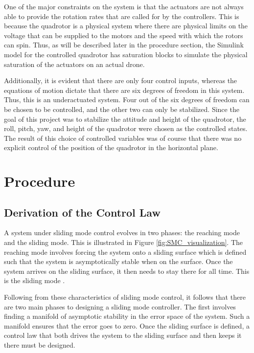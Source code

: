 \documentclass[12pt]{article}
\begin{document}
One of the major constraints on the system is that the actuators are not always able to provide the rotation rates that are called for by the controllers. This is because the quadrotor is a physical system where there are physical limits on the voltage that can be supplied to the motors and the speed with which the rotors can spin. Thus, as will be described later in the procedure section, the Simulink model for the controlled quadrotor has saturation blocks to simulate the physical saturation of the actuators on an actual drone.

Additionally, it is evident that there are only four control inputs, whereas the equations of motion dictate that there are six degrees of freedom in this system. Thus, this is an underactuated system. Four out of the six degrees of freedom can be chosen to be controlled, and the other two can only be stabilized. Since the goal of this project was to stabilize the attitude and height of the quadrotor, the roll, pitch, yaw, and height of the quadrotor were chosen as the controlled states. The result of this choice of controlled variables was of course that there was no explicit control of the position of the quadrotor in the horizontal plane. 


\section{Procedure}
\subsection{Derivation of the Control Law}
A system under sliding mode control evolves in two phases: the reaching mode and the sliding mode. This is illustrated in Figure \ref{fig:SMC_visualization}. The reaching mode involves forcing the system onto a sliding surface which is defined such that the system is asymptotically stable when on the surface. Once the system arrives on the sliding surface, it then needs to stay there for all time. This is the sliding mode \cite{SMCControlObservation}.

Following from these characteristics of sliding mode control, it follows that there are two main phases to designing a sliding mode controller. The first involves finding a manifold of asymptotic stability in the error space of the system. Such a manifold ensures that the error goes to zero. Once the sliding surface is defined, a control law that both drives the system to the sliding surface and then keeps it there must be designed\cite{SMCControlObservation}.
\end{document}
